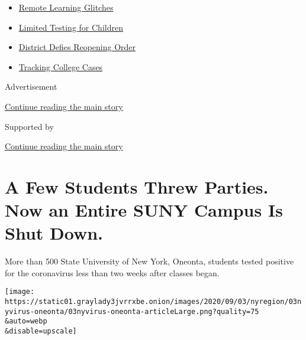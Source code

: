 \begin{itemize}
\tightlist
\item
  \href{https://www.nytimes3xbfgragh.onion/2020/09/08/us/school-districts-cyberattacks-glitches.html?name=styln-coronavirus-schools-reopening\&region=TOP_BANNER\&block=storyline_menu_recirc\&action=click\&pgtype=Article\&impression_id=90767e70-f4c9-11ea-8835-87be5503a188\&variant=undefined}{Remote
  Learning Glitches}
\item
  \href{https://www.nytimes3xbfgragh.onion/2020/09/08/upshot/children-testing-shortfalls-virus.html?name=styln-coronavirus-schools-reopening\&region=TOP_BANNER\&block=storyline_menu_recirc\&action=click\&pgtype=Article\&impression_id=90767e71-f4c9-11ea-8835-87be5503a188\&variant=undefined}{Limited
  Testing for Children}
\item
  \href{https://www.nytimes3xbfgragh.onion/2020/09/10/us/des-moines-school-opening-coronavirus.html?name=styln-coronavirus-schools-reopening\&region=TOP_BANNER\&block=storyline_menu_recirc\&action=click\&pgtype=Article\&impression_id=90767e72-f4c9-11ea-8835-87be5503a188\&variant=undefined}{District
  Defies Reopening Order}
\item
  \href{https://www.nytimes3xbfgragh.onion/interactive/2020/us/covid-college-cases-tracker.html?name=styln-coronavirus-schools-reopening\&region=TOP_BANNER\&block=storyline_menu_recirc\&action=click\&pgtype=Article\&impression_id=90767e73-f4c9-11ea-8835-87be5503a188\&variant=undefined}{Tracking
  College Cases}
\end{itemize}

Advertisement

\protect\hyperlink{after-top}{Continue reading the main story}

Supported by

\protect\hyperlink{after-sponsor}{Continue reading the main story}

\hypertarget{a-few-students-threw-parties-now-an-entire-suny-campus-is-shut-down}{%
\section{A Few Students Threw Parties. Now an Entire SUNY Campus Is Shut
Down.}\label{a-few-students-threw-parties-now-an-entire-suny-campus-is-shut-down}}

More than 500 State University of New York, Oneonta, students tested
positive for the coronavirus less than two weeks after classes began.

\texttt{[image: https://static01.graylady3jvrrxbe.onion/images/2020/09/03/nyregion/03nyvirus-oneonta/03nyvirus-oneonta-articleLarge.png?quality=75\\\&auto=webp\\\&disable=upscale]}

